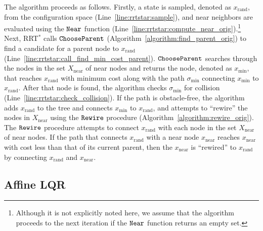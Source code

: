 The algorithm proceeds as follows.
Firstly, a state is sampled, denoted as
$x_\mathrm{rand}$, from the configuration space
(Line~\ref{line:rrtstar:sample}), and near neighbors are evaluated
using the ${\tt Near}$ function
(Line~\ref{line:rrtstar:compute_near_orig}).\footnote{Although it is not
  explicitly noted here,
 we assume that the algorithm proceeds to
  the next iteration if the ${\tt Near}$ function returns an empty
  set.} Next, RRT$^*$ calls ${\tt ChooseParent}$
(Algorithm~\ref{algorithm:find_parent_orig}) to find a candidate for a
parent node to $x_\mathrm{rand}$
(Line~\ref{line:rrtstar:call_find_min_cost_parent}). ${\tt
ChooseParent}$ searches through the nodes in the set
$X_\mathrm{near}$ of near nodes and returns the node, denoted as
$x_\mathrm{min}$, that reaches $x_\mathrm{rand}$ with minimum cost
along with the path $\sigma_\mathrm{min}$ connecting
$x_\mathrm{min}$ to $x_\mathrm{rand}$. After that node
is found, the algorithm checks $\sigma_\mathrm{min}$ for collision
(Line~\ref{line:rrtstar:check_collision}). If the path
is obstacle-free,
the algorithm adds
$x_\mathrm{rand}$ to the tree and connects $x_\mathrm{min}$ to
$x_\mathrm{rand}$, and attempts to ``rewire'' the nodes in
$X_\mathrm{near}$ using the ${\tt Rewire}$ procedure
(Algorithm~\ref{algorithm:rewire_orig}). The ${\tt Rewire}$
procedure attempts to connect $x_\mathrm{rand}$ with each node in the
set $X_\mathrm{near}$ of near nodes. If the path that connects
$x_\mathrm{rand}$ with a near node $x_\mathrm{near}$ reaches
$x_\mathrm{near}$ with cost less than that of its current parent, then
the $x_\mathrm{near}$ is ``rewired'' to $x_\mathrm{rand}$ by
connecting $x_\mathrm{rand}$ and $x_\mathrm{near}$.

\subsection{Affine LQR}
\label{sect:affine_lqr}

